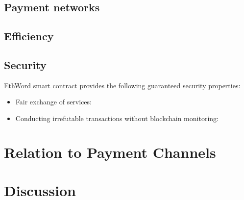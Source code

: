 \subsection{Payment networks} 

\subsection{Efficiency}

\subsection{Security}

EthWord smart contract provides the following guaranteed security properties:
\begin{itemize}
	\item Fair exchange of services:
	\item Conducting irrefutable transactions without blockchain monitoring:
\end{itemize}


\section{Relation to Payment Channels}


\section{Discussion}


















